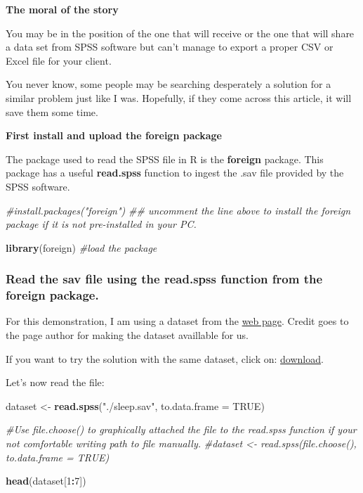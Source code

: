\documentclass[]{article}
\newenvironment{Shaded}{\begin{snugshade}}{\end{snugshade}}
\newcommand{\CommentTok}[1]{\textcolor[rgb]{0.56,0.35,0.01}{\textit{#1}}}
\newcommand{\DataTypeTok}[1]{\textcolor[rgb]{0.13,0.29,0.53}{#1}}
\newcommand{\DecValTok}[1]{\textcolor[rgb]{0.00,0.00,0.81}{#1}}
\newcommand{\KeywordTok}[1]{\textcolor[rgb]{0.13,0.29,0.53}{\textbf{#1}}}
\newcommand{\NormalTok}[1]{#1}
\newcommand{\OperatorTok}[1]{\textcolor[rgb]{0.81,0.36,0.00}{\textbf{#1}}}
\newcommand{\OtherTok}[1]{\textcolor[rgb]{0.56,0.35,0.01}{#1}}
\newcommand{\StringTok}[1]{\textcolor[rgb]{0.31,0.60,0.02}{#1}}
\begin{document}
\textbf{The moral of the story}

You may be in the position of the one that will receive or the one that
will share a data set from SPSS software but can't manage to export a
proper CSV or Excel file for your client.

You never know, some people may be searching desperately a solution for
a similar problem just like I was. Hopefully, if they come across this
article, it will save them some time.

\textbf{First install and upload the foreign package}

The package used to read the SPSS file in R is the \textbf{foreign}
package. This package has a useful \textbf{read.spss} function to ingest
the .sav file provided by the SPSS software.

\begin{Shaded}
\begin{Highlighting}[]
\CommentTok{#install.packages("foreign") }
\CommentTok{## uncomment the line above to install the foreign package if it is not pre-installed in your PC.}

\KeywordTok{library}\NormalTok{(foreign) }\CommentTok{#load the package}
\end{Highlighting}
\end{Shaded}

\hypertarget{read-the-sav-file-using-the-read.spss-function-from-the-foreign-package.}{%
\subsubsection{Read the sav file using the read.spss function from the
foreign
package.}\label{read-the-sav-file-using-the-read.spss-function-from-the-foreign-package.}}

For this demonstration, I am using a dataset from the
\href{http://spss.allenandunwin.com.s3-website-ap-southeast-2.amazonaws.com/data-files.html\#.XmlmC6hKjIU}{web
page}. Credit goes to the page author for making the dataset availlable
for us.

If you want to try the solution with the same dataset, click on:
\href{http://spss.allenandunwin.com.s3-website-ap-southeast-2.amazonaws.com/Files/sleep.zip}{download}.

Let's now read the file:

\begin{Shaded}
\begin{Highlighting}[]
\NormalTok{dataset <-}\StringTok{ }\KeywordTok{read.spss}\NormalTok{(}\StringTok{"./sleep.sav"}\NormalTok{, }\DataTypeTok{to.data.frame =} \OtherTok{TRUE}\NormalTok{)}

\CommentTok{#Use file.choose() to graphically attached the file to the read.spss function if your not comfortable writing path to file manually. }
\CommentTok{#dataset <- read.spss(file.choose(), to.data.frame = TRUE)}

\KeywordTok{head}\NormalTok{(dataset[}\DecValTok{1}\OperatorTok{:}\DecValTok{7}\NormalTok{])}
\end{Highlighting}
\end{Shaded}
\end{document}

